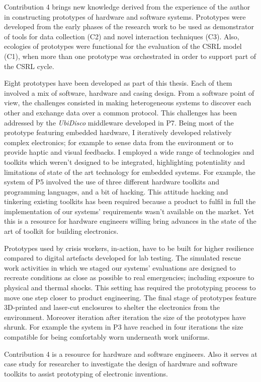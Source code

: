 Contribution 4 brings new knowledge derived from the experience of the author in constructing prototypes of hardware and software systems. Prototypes were developed from the early phases of the research work to be used as demonstrator of tools for data collection (C2) and novel interaction techniques (C3). Also, ecologies of prototypes were functional for the evaluation of the CSRL model (C1), when more than one prototype was orchestrated in order to support part of the CSRL cycle.

Eight prototypes have been developed as part of this thesis. Each of them involved a mix of software, hardware and casing design. From a software point of view, the challenges consisted in making heterogeneous systems to discover each other and exchange data over a common protocol. This challenges has been addressed by the \emph{UbiDisco} middleware developed in P7. Being most of the prototype featuring embedded hardware, I iteratively developed relatively complex electronics; for example to sense data from the environment or to provide haptic and visual feedbacks. I employed a wide range of technologies and toolkits which weren't designed to be integrated, highlighting potentiality and limitations of state of the art technology for embedded systems. For example, the system of P5 involved the use of three different hardware toolkits and programming languages, and a bit of hacking. This attitude hacking and tinkering existing toolkits has been required because a product to fulfil in full the implementation of our systems' requirements wasn't available on the market. Yet this is a resource for hardware engineers willing bring advances in the state of the art of toolkit for building electronics.

Prototypes used by crisis workers, in-action, have to be built for higher resilience compared to digital artefacts developed for lab testing. The simulated rescue work activities in which we staged our systems' evaluations are designed to recreate conditions as close as possible to real emergencies; including exposure to physical and thermal shocks. This setting has required the prototyping process to move one step closer to product engineering. The final stage of prototypes feature 3D-printed and laser-cut enclosures to shelter the electronics from the environment. Moreover iteration after iteration the size of the prototypes have shrunk. For example the system in P3 have reached in four iterations the size compatible for being comfortably worn underneath work uniforms.

Contribution 4 is a resource for hardware and software engineers. Also it serves at case study for researcher to investigate the design of hardware and software toolkits to assist prototyping of electronic inventions. 
